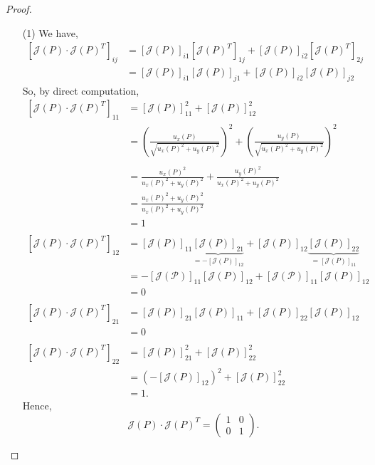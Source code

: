 \documentclass[10pt]{article}
\theoremstyle{plain}
\begin{document}
	\begin{proof} ~
		\begin{itemize}
			\item[(1)] We have,
				\begin{align*}
					\left[\mathcal{J}(P) \cdot \mathcal{J}(P)^T\right]_{ij} &= [\mathcal{J}(P)]_{i1} [\mathcal{J}(P)^T]_{1j} + [\mathcal{J}(P)]_{i2} [\mathcal{J}(P)^T]_{2j} \\
					&= [\mathcal{J}(P)]_{i1} [\mathcal{J}(P)]_{j1} + [\mathcal{J}(P)]_{i2} [\mathcal{J}(P)]_{j2}
				\end{align*}
			So, by direct computation,
				\begin{align*}
					\left[\mathcal{J}(P) \cdot \mathcal{J}(P)^T\right]_{11} &= [\mathcal{J}(P)]_{11}^2 + [\mathcal{J}(P)]_{12}^2 \\
					&= \left(\frac{u_x(P)}{\sqrt{u_x(P)^2 + u_y(P)^2}}\right)^2 + \left(\frac{u_y(P)}{\sqrt{u_x(P)^2 + u_y(P)^2}}\right)^2 \\ \\
					&= \frac{u_x(P)^2}{u_x(P)^2 + u_y(P)^2} + \frac{u_y(P)^2}{u_x(P)^2 + u_y(P)^2} \\
					&= \frac{u_x(P)^2 + u_y(P)^2}{u_x(P)^2 + u_y(P)^2} \\
					&= 1 \\ 
					\\
					\left[\mathcal{J}(P) \cdot \mathcal{J}(P)^T\right]_{12} &= [\mathcal{J}(P)]_{11} \underbrace{[\mathcal{J}(P)]_{21}}_{= - [\mathcal{J}(P)]_{12}} + [\mathcal{J}(P)]_{12} \underbrace{[\mathcal{J}(P)]_{22}}_{= [\mathcal{J}(P)]_{11}} \\
					&= -[\mathcal{J(P)}]_{11} [\mathcal{J}(P)]_{12} + [\mathcal{J(P)}]_{11} [\mathcal{J}(P)]_{12} \\
					&= 0 \\
					\\
					\left[\mathcal{J}(P) \cdot \mathcal{J}(P)^T\right]_{21} &= [\mathcal{J}(P)]_{21} [\mathcal{J}(P)]_{11} + [\mathcal{J}(P)]_{22}[\mathcal{J}(P)]_{12} \\
					&= 0 \\
					\\
						\left[\mathcal{J}(P) \cdot \mathcal{J}(P)^T\right]_{22} &= [\mathcal{J}(P)]_{21}^2 + [\mathcal{J}(P)]_{22}^2 \\
						&= (-[\mathcal{J}(P)]_{12})^2 + [\mathcal{J}(P)]_{22}^2 \\
						&= 1.
				\end{align*}
		Hence, $$\mathcal{J}(P) \cdot \mathcal{J}(P)^T = \begin{pmatrix} 1 & 0 \\ 0 & 1\end{pmatrix}.$$

\end{itemize}
\end{proof}
\end{document}
